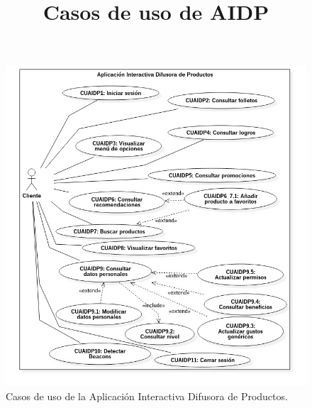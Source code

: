 \title{\textbf{Casos de uso de AIDP}\\ \par}

\FloatBarrier
\begin{figure}[htbp!]
		\centering
			\includegraphics[width=.9 \textwidth]{imagenes/Diagramas_UserApp/casosDeUso_prototipo1}
		\caption{Casos de uso de la Aplicación Interactiva Difusora de Productos.}
		\label{image:casosdeusoAIDPP1}
\end{figure}
\FloatBarrier
\newpage
